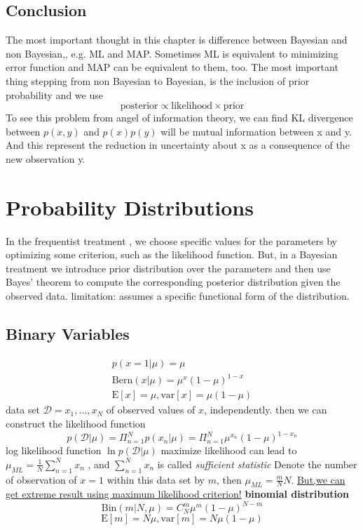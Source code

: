 \documentclass[a4paper]{book}
\begin{document}
\subsection{Conclusion}
The most important thought in this chapter is difference between Bayesian and non Bayesian,, e.g. ML and MAP.  Sometimes ML is equivalent to minimizing error function and MAP can be equivalent to them, too.\newline
The most important thing stepping from non Bayesian to Bayesian, is the inclusion of prior probability and we use $$\mathrm{posterior} \propto \mathrm{likelihood} \times\mathrm{prior}$$
To see this problem from angel of information theory, we can find KL divergence between $p(x,y)$ and $p(x)p(y)$ will be mutual information between x and y. And this represent the reduction in uncertainty about x as a consequence of the new observation y.

\section{Probability Distributions}
In the frequentist treatment , we choose specific values for the parameters by optimizing some criterion, such as the likelihood function. But, in a Bayesian treatment we introduce prior distribution over the parameters and then use Bayes' theorem to compute the corresponding posterior distribution given the observed data.\newline
limitation:  assumes a specific functional form of the distribution.
\subsection{Binary Variables}
\begin{gather}\label{eq1.2.1}
  p(x=1|\mu) = \mu \\
  \mathrm {Bern}(x|\mu) = \mu^x(1-\mu)^{1-x} \\
  \mathrm E[x] = \mu, \mathrm  {var}[x]=\mu(1-\mu)
\end{gather}
data set $\mathcal D={x_1,\dots,x_N}$ of observed values of $x$, independently.\newline
then we can construct the likelihood function
\begin{equation}\label{1.2.2}
p(\mathcal D|\mu) = \Pi_{n=1}^Np(x_n|\mu) = \Pi_{n=1}^N\mu^{x_n}(1-\mu)^{1-x_n}
\end{equation}
log likelihood function $\ln p(\mathcal D|\mu)$\newline
maximize likelihood can lead to $\mu_{ML} = \frac1N\sum_{n=1}^Nx_n$ , and $\sum_{n=1}^Nx_n$ is called \emph{sufficient statistic}\newline
Denote the number of observation of $x = 1 $ within this data set by $m$, then  $\mu_{ML}=\frac mNN$. \newline
\uline{But,we can get extreme result using maximum likelihood criterion!}
\textbf{binomial distribution}
$$\mathrm{Bin}(m|N,\mu) = C_N^m\mu^m(1-\mu)^{N-m} $$
$$\mathrm E[m]=N\mu, \mathrm  {var}[m]=N\mu(1-\mu)$$
\end{document}

